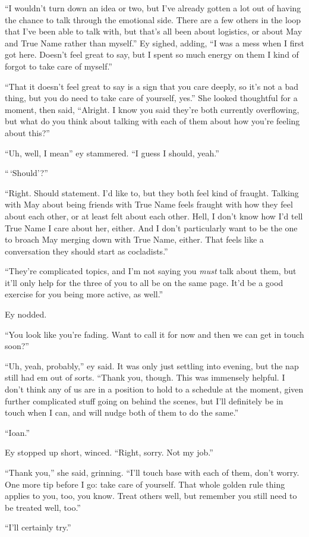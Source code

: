 ``I wouldn't turn down an idea or two, but I've already gotten a lot out of having the chance to talk through the emotional side. There are a few others in the loop that I've been able to talk with, but that's all been about logistics, or about May and True Name rather than myself.'' Ey sighed, adding, ``I was a mess when I first got here. Doesn't feel great to say, but I spent so much energy on them I kind of forgot to take care of myself.''

``That it doesn't feel great to say is a sign that you care deeply, so it's not a bad thing, but you do need to take care of yourself, yes.'' She looked thoughtful for a moment, then said, ``Alright. I know you said they're both currently overflowing, but what do you think about talking with each of them about how you're feeling about this?''

``Uh, well, I mean'' ey stammered. ``I guess I should, yeah.''

``\,`Should'?''

``Right. Should statement. I'd like to, but they both feel kind of fraught. Talking with May about being friends with True Name feels fraught with how they feel about each other, or at least felt about each other. Hell, I don't know how I'd tell True Name I care about her, either. And I don't particularly want to be the one to broach May merging down with True Name, either. That feels like a conversation they should start as cocladists.''

``They're complicated topics, and I'm not saying you \emph{must} talk about them, but it'll only help for the three of you to all be on the same page. It'd be a good exercise for you being more active, as well.''

Ey nodded.

``You look like you're fading. Want to call it for now and then we can get in touch soon?''

``Uh, yeah, probably,'' ey said. It was only just settling into evening, but the nap still had em out of sorts. ``Thank you, though. This was immensely helpful. I don't think any of us are in a position to hold to a schedule at the moment, given further complicated stuff going on behind the scenes, but I'll definitely be in touch when I can, and will nudge both of them to do the same.''

``Ioan.''

Ey stopped up short, winced. ``Right, sorry. Not my job.''

``Thank you,'' she said, grinning. ``I'll touch base with each of them, don't worry. One more tip before I go: take care of yourself. That whole golden rule thing applies to you, too, you know. Treat others well, but remember you still need to be treated well, too.''

``I'll certainly try.''
